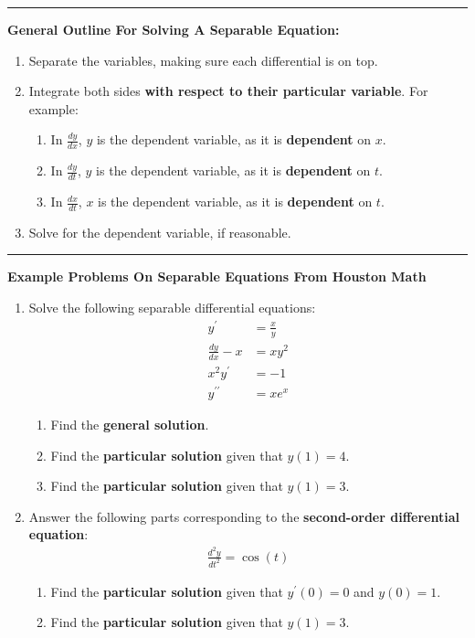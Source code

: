 \documentclass[11pt]{article}
\begin{document}
\noindent\rule{\linewidth}{0.4pt}
\textbf{General Outline For Solving A Separable Equation:}
\begin{enumerate}[topsep=2pt, itemsep=2pt, leftmargin=*]
    \item Separate the variables, making sure each differential is on top.
    \item Integrate both sides \textbf{with respect to their particular variable}. For example:
    \begin{enumerate}
        \item In $\frac{dy}{dx}$, $y$ is the dependent variable, as it is \textbf{dependent} on $x$.
        \item In $\frac{dy}{dt}$, $y$ is the dependent variable, as it is \textbf{dependent} on $t$.
        \item In $\frac{dx}{dt}$, $x$ is the dependent variable, as it is \textbf{dependent} on $t$.
    \end{enumerate}
    \item Solve for the dependent variable, if reasonable.
\end{enumerate}
\noindent\rule{\linewidth}{0.4pt}
\newpage

\textbf{Example Problems On Separable Equations From Houston Math}

\begin{enumerate}
  \item Solve the following separable differential equations:
  \begin{align}
    {y^{\prime}} &= \frac{x}{y} \\
    \frac{dy}{dx} - x &= xy^{2}\\
    x^{2}y^{\prime} &= -1 \\
    y^{\prime\prime} &= xe^{x}
  \end{align}

  \begin{enumerate}[topsep=2pt, itemsep=2pt, leftmargin=*]
    \item Find the \textbf{general solution}.
    \item Find the \textbf{particular solution} given that $y(1)=4$.
    \item Find the \textbf{particular solution} given that $y(1)=3$.
  \end{enumerate}

  \item Answer the following parts corresponding to the \textbf{second-order differential equation}:
  \begin{align}
    \frac{d^{2}y}{dt^{2}} = \cos(t)
  \end{align}

  \begin{enumerate}[topsep=2pt, itemsep=2pt, leftmargin=*]
    \item Find the \textbf{particular solution} given that $y^{\prime}(0) = 0$ and $y(0) = 1$.
    \item Find the \textbf{particular solution} given that $y(1)=3$.
  \end{enumerate}
\end{enumerate}
\end{document}
